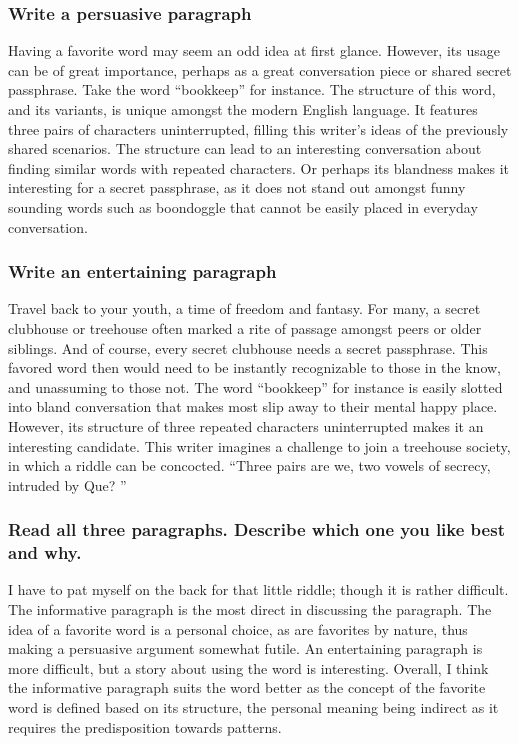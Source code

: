 \documentclass[12pt]{article}
\begin{document}
\subsubsection{Write a persuasive paragraph}

Having a favorite word may seem an odd idea at first glance.
However, its usage can be of great importance, perhaps as a great conversation piece or shared secret passphrase.
Take the word ``bookkeep'' for instance. 
The structure of this word, and its variants, is unique amongst the modern English language.
It features three pairs of characters uninterrupted, filling this writer's ideas of the previously shared scenarios.
The structure can lead to an interesting conversation about finding similar words with repeated characters.
Or perhaps its blandness makes it interesting for a secret passphrase, as it does not stand out amongst funny sounding words such as boondoggle that cannot be easily placed in everyday conversation.


\subsubsection{Write an entertaining paragraph}

Travel back to your youth, a time of freedom and fantasy.
For many, a secret clubhouse or treehouse often marked a rite of passage amongst peers or older siblings.
And of course, every secret clubhouse needs a secret passphrase.
This favored word then would need to be instantly recognizable to those in the know, and unassuming to those not.
The word ``bookkeep'' for instance is easily slotted into bland conversation that makes most slip away to their mental happy place.
However, its structure of three repeated characters uninterrupted makes it an interesting candidate.
This writer imagines a challenge to join a treehouse society, in which a riddle can be concocted.
``Three pairs are we, two vowels of secrecy, intruded by Que? ''


\subsubsection{Read all three paragraphs. Describe which one you like best and why.}

I have to pat myself on the back for that little riddle; though it is rather difficult.
The informative paragraph is the most direct in discussing the paragraph.
The idea of a favorite word is a personal choice, as are favorites by nature, thus making a persuasive argument somewhat futile.
An entertaining paragraph is more difficult, but a story about using the word is interesting.
Overall, I think the informative paragraph suits the word better as the concept of the favorite word is defined based on its structure, 
the personal meaning being indirect as it requires the predisposition towards patterns.
\end{document}
